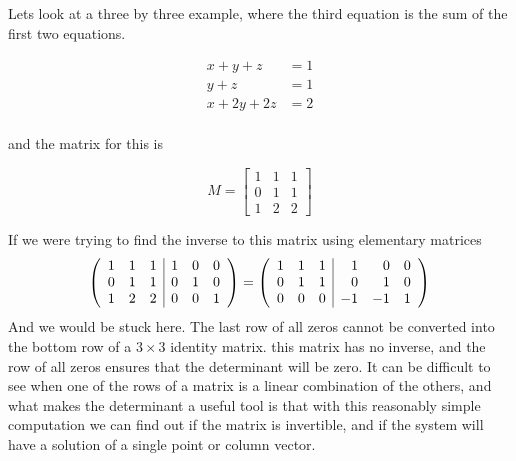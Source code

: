 {Lets look at a three by three example, where the third equation is the sum of the first two equations.

\begin{align*}
x+y + z &= 1\\
y +z &= 1\\
x + 2y+ 2z &= 2\\
\end{align*}

and the matrix for this is 

\[
M =\begin{bmatrix}
1 & 1 &1\\
0 & 1 & 1\\
1 & 2& 2 
\end{bmatrix}
\]

If we were trying to find the inverse to this matrix using elementary matrices
\[ \left( \begin{array}{ccc | ccc}
1 & 1 &1 & 	1 & 0 & 0\\
0 & 1 & 1 & 	0 & 1 & 0 \\
1 & 2 & 2 &	0 & 0 & 1
\end{array} \right) 
=
 \left( \begin{array}{ccc | rrr}
1 & 1 &1 & 	1 & 0 & 0\\
0 & 1 & 1 & 	0 & 1 & 0 \\
0 & 0 & 0 &	-1 & -1 & 1
\end{array} \right) 
\]
And we would be stuck here. The last row of all zeros cannot be converted into the bottom row of a $3 \times 3$ identity matrix. this matrix has no inverse, and the row of all zeros ensures that the determinant will be zero. It can be difficult to see when one of the rows of a matrix is a linear combination of the others, and what makes the determinant a useful tool is that with this reasonably simple computation we can find out if the matrix is invertible, and if the system will have a solution of a single point or column vector. 
} %


